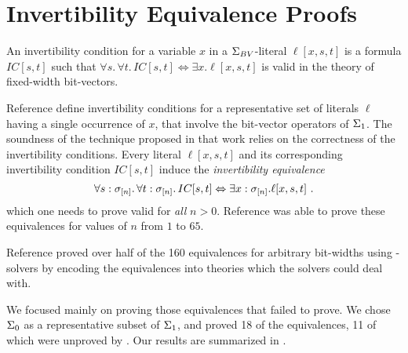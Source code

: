 \documentclass[10pt,conference]{IEEEtran}
\begin{document}
\section{Invertibility Equivalence Proofs}
\label{ieproofs}
An invertibility condition for a variable $x$ in a $\Sigma_{BV}$-literal $\ell[x,s,t]$ is
a formula $IC[s,t]$ such that
$\forall s.\,\forall t.\,IC[s,t] \Leftrightarrow \exists x.\ell[x,s,t]$ is valid in the theory of fixed-width bit-vectors.

Reference \cite{b1} define invertibility conditions for 
a representative set of literals $\ell$ having a single occurrence of $x$,
that involve the bit-vector operators of $\Sigma_{1}$.
The soundness of the technique proposed in that work 
relies on the correctness of the invertibility conditions.
Every literal $\ell[x,s,t]$ and its corresponding invertibility condition $IC[s,t]$
induce the \emph{invertibility equivalence}
\[
\forall s:\sigma_{[n]}.\,\forall t:\sigma_{[n]}.\,IC[s,t] \Leftrightarrow \exists x:\sigma_{[n]}.\ell[x,s,t] \ .
\]
which one needs to prove valid for \emph{all} $n >0$.
Reference \cite{b1} was able to prove these 
equivalences for values of $n$ from $1$ to $65$.

Reference \cite{b2} proved over half of the 160 
equivalences for arbitrary bit-widths 
using \smt-solvers by encoding the equivalences 
into theories which the solvers could deal with.

We focused mainly on proving those equivalences 
that \cite{b2} failed to prove. We chose $\Sigma_{0}$ as a 
representative subset of $\Sigma_{1}$, and proved 18 of the 
equivalences, 11 of which were unproved by \cite{b2}. Our 
results are summarized in .
\end{document}
